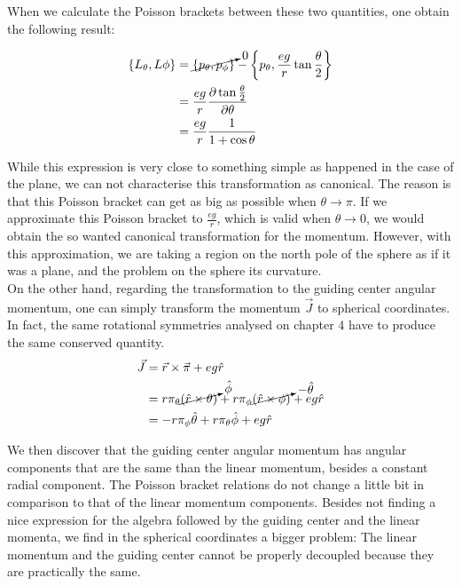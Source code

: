 When we calculate the Poisson brackets between these two quantities, one obtain the following result:

\begin{align*}
\left\lbrace L_\theta, L\phi \right\rbrace &= \cancelto{0}{\left\lbrace p_\theta, p_\phi \right\rbrace}-\left\lbrace p_\theta, \frac{eg}{r}\tan{\frac{\theta}{2}} \right\rbrace\\
&= \frac{eg}{r}\frac{\partial \tan{\frac{\theta}{2}} }{\partial \theta}\\
&=  \frac{eg}{r} \frac{1}{1+\cos{\theta}}
\end{align*}

While this expression is very close to something simple as happened in the case of the plane, we can not characterise this transformation as canonical. The reason is that this Poisson bracket can get as big as possible when $\theta \to \pi$. If we approximate this Poisson bracket to $\frac{eg}{r}$, which is valid when $\theta \to 0$, we would obtain the so wanted canonical transformation for the momentum. However, with this approximation, we are taking a region on the north pole of the sphere as if it was a plane, and the problem on the sphere its curvature.\\

On the other hand, regarding the transformation to the guiding center angular momentum, one can simply transform the momentum $\vec{J}$ to spherical coordinates. In fact, the same rotational symmetries analysed on chapter 4 have to produce the same conserved quantity.\\

\begin{align*}
\vec{J} &= \vec{r}\times\vec{\pi} + eg\hat{r}\\
&= r\pi_\theta \cancelto{\hat{\phi}}{(\hat{r}\times \theta)} + r\pi_\phi \cancelto{-\hat{\theta}}{(\hat{r}\times \phi)} + eg\hat{r}\\
&= -r\pi_\phi \hat{\theta} + r\pi_\theta \hat{\phi} + eg\hat{r}
\end{align*}

We then discover that the guiding center angular momentum has angular components that are the same than the linear momentum, besides a constant radial component. The Poisson bracket relations do not change a little bit in comparison to that of the linear momentum components. Besides not finding a nice expression for the algebra followed by the guiding center and the linear momenta, we find in the spherical coordinates a bigger problem: The linear momentum and the guiding center cannot be properly decoupled because they are practically the same.\\

